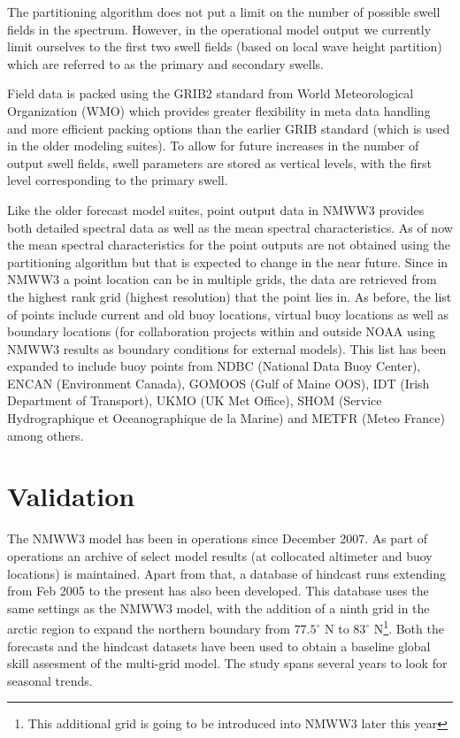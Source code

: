 \documentclass[12pt]{article}
\newcommand{\degree}{^\circ}
\begin{document}
The partitioning algorithm does not put a limit on the number of
possible swell fields in the spectrum. However, in the operational
model output we currently limit ourselves to the first two swell
fields (based on local wave height partition) which are referred to as
the primary and secondary swells.

Field data is packed using the GRIB2 standard from World
Meteorological Organization (WMO) which provides greater flexibility
in meta data handling and more efficient packing options than the
earlier GRIB standard (which is used in the older modeling suites). To
allow for future increases in the number of output swell fields, swell
parameters are stored as vertical levels, with the first level
corresponding to the primary swell.

Like the older forecast model suites, point output data in NMWW3
provides both detailed spectral data as well as the mean spectral
characteristics. As of now the mean spectral characteristics for the
point outputs are not obtained using the partitioning algorithm but
that is expected to change in the near future. Since in NMWW3 a point
location can be in multiple grids, the data are retrieved from the
highest rank grid (highest resolution) that the point lies in. As
before, the list of points include current and old buoy locations,
virtual buoy locations as well as boundary locations (for
collaboration projects within and outside NOAA using NMWW3 results as
boundary conditions for external models). This list has been
expanded to include buoy points from NDBC (National Data Buoy Center),
ENCAN (Environment Canada), GOMOOS (Gulf of Maine OOS), IDT (Irish
Department of Transport), UKMO (UK Met Office), SHOM (Service
Hydrographique et Oceanographique de la Marine) and METFR (Meteo
France) among others.

\section{Validation}

The NMWW3 model has been in operations since December 2007. As part of
operations an archive of select model results (at collocated altimeter
and buoy locations) is maintained. Apart from that, a database of
hindcast runs extending from Feb 2005 to the present has also been
developed. This database uses the same settings as the NMWW3 model,
with the addition of a ninth grid in the arctic region to expand the
northern boundary from $77.5\degree$ N to $83\degree$ N\footnote{This
additional grid is going to be introduced into NMWW3 later this
year}. Both the forecasts and the hindcast datasets have been used to
obtain a baseline global skill assesment of the multi-grid model. The
study spans several years to look for seasonal trends.
\end{document}
